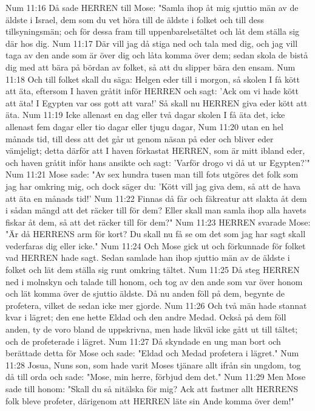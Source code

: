 Num 11:16  Då sade HERREN till Mose: "Samla ihop åt mig sjuttio män av de äldste i Israel, dem som du vet höra till de äldste i folket och till dess tillsyningsmän; och för dessa fram till uppenbarelsetältet och låt dem ställa sig där hos dig.
Num 11:17  Där vill jag då stiga ned och tala med dig, och jag vill taga av den ande som är över dig och låta komma över dem; sedan skola de bistå dig med att bära på bördan av folket, så att du slipper bära den ensam.
Num 11:18  Och till folket skall du säga: Helgen eder till i morgon, så skolen I få kött att äta, eftersom I haven gråtit inför HERREN och sagt: 'Ack om vi hade kött att äta! I Egypten var oss gott att vara!' Så skall nu HERREN giva eder kött att äta.
Num 11:19  Icke allenast en dag eller två dagar skolen I få äta det, icke allenast fem dagar eller tio dagar eller tjugu dagar,
Num 11:20  utan en hel månads tid, till dess att det går ut genom näsan på eder och bliver eder vämjeligt; detta därför att I haven förkastat HERREN, som är mitt ibland eder, och haven gråtit inför hans ansikte och sagt: 'Varför drogo vi då ut ur Egypten?'"
Num 11:21  Mose sade: "Av sex hundra tusen man till fots utgöres det folk som jag har omkring mig, och dock säger du: 'Kött vill jag giva dem, så att de hava att äta en månads tid!'
Num 11:22  Finnas då får och fäkreatur att slakta åt dem i sådan mängd att det räcker till för dem? Eller skall man samla ihop alla havets fiskar åt dem, så att det räcker till för dem?"
Num 11:23  HERREN svarade Mose: "Är då HERRENS arm för kort? Du skall nu få se om det som jag har sagt skall vederfaras dig eller icke."
Num 11:24  Och Mose gick ut och förkunnade för folket vad HERREN hade sagt. Sedan samlade han ihop sjuttio män av de äldste i folket och lät dem ställa sig runt omkring tältet.
Num 11:25  Då steg HERREN ned i molnskyn och talade till honom, och tog av den ande som var över honom och lät komma över de sjuttio äldste. Då nu anden föll på dem, begynte de profetera, vilket de sedan icke mer gjorde.
Num 11:26  Och två män hade stannat kvar i lägret; den ene hette Eldad och den andre Medad. Också på dem föll anden, ty de voro bland de uppskrivna, men hade likväl icke gått ut till tältet; och de profeterade i lägret.
Num 11:27  Då skyndade en ung man bort och berättade detta för Mose och sade: "Eldad och Medad profetera i lägret."
Num 11:28  Josua, Nuns son, som hade varit Moses tjänare allt ifrån sin ungdom, tog då till orda och sade: "Mose, min herre, förbjud dem det."
Num 11:29  Men Mose sade till honom: "Skall du så nitälska för mig? Ack att fastmer allt HERRENS folk bleve profeter, därigenom att HERREN läte sin Ande komma över dem!"
